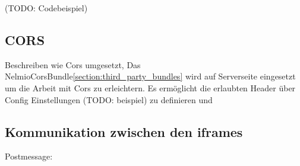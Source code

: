 (TODO: Codebeispiel)

\subsection{CORS}

Beschreiben wie Cors umgesetzt, Das NelmioCorsBundle\ref{section:third_party_bundles} wird auf Serverseite eingesetzt um die Arbeit mit Cors zu erleichtern. Es ermöglicht die erlaubten Header über Config Einstellungen (TODO: beispiel) zu definieren und 

\subsection{Kommunikation zwischen den iframes}
Postmessage: 


